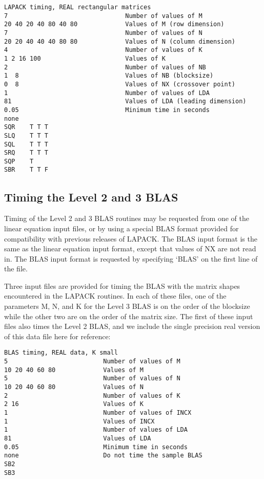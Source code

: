 \begin{verbatim}
LAPACK timing, REAL rectangular matrices
7                                Number of values of M
20 40 20 40 80 40 80             Values of M (row dimension)
7                                Number of values of N
20 20 40 40 40 80 80             Values of N (column dimension)
4                                Number of values of K
1 2 16 100                       Values of K
2                                Number of values of NB
1  8                             Values of NB (blocksize)
0  8                             Values of NX (crossover point)
1                                Number of values of LDA
81                               Values of LDA (leading dimension)
0.05                             Minimum time in seconds
none
SQR    T T T
SLQ    T T T
SQL    T T T
SRQ    T T T
SQP    T
SBR    T T F
\end{verbatim}

\subsection{Timing the Level 2 and 3 BLAS}

\dent
Timing of the Level 2 and 3 BLAS routines may be requested from one
of the linear equation input files, or by using a special BLAS format
provided for compatibility with previous releases of LAPACK.
The BLAS input format is the same as the linear equation input
format, except that values of NX are not read in.
The BLAS input format is requested by specifying `BLAS' on the first
line of the file.

Three input files are provided for timing the BLAS with the matrix
shapes encountered in the LAPACK routines.  In each of these files,
one of the parameters M, N, and K for the Level 3
BLAS is on the order of the blocksize while the other two are on
the order of the matrix size.  The first of these input files also
times the Level 2 BLAS, and we include the single precision real
version of this data file here for reference:

\begin{verbatim}
BLAS timing, REAL data, K small
5                          Number of values of M
10 20 40 60 80             Values of M
5                          Number of values of N
10 20 40 60 80             Values of N
2                          Number of values of K
2 16                       Values of K
1                          Number of values of INCX 
1                          Values of INCX
1                          Number of values of LDA
81                         Values of LDA
0.05                       Minimum time in seconds
none                       Do not time the sample BLAS
SB2
SB3
\end{verbatim}


